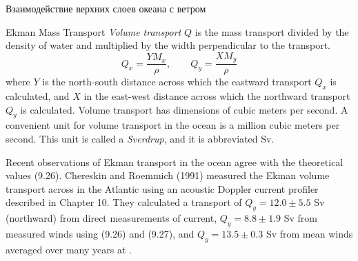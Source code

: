 \begin{chapter}{Взаимодействие верхних слоев океана с ветром}
\begin{section}{Ekman Mass Transport}
\textit{Volume transport} $Q$ is the mass
transport divided by the density of water and multiplied by the width
perpendicular to the transport.
\begin{equation}
 Q_x=\frac{Y M_x}{\rho}, \qquad Q_y=\frac{X M_y}{\rho}
\end{equation}
where $Y$ is the north-south distance across which the eastward
transport $Q_x$ is calculated, and $X$ in
the east-west distance across which the northward transport $Q_y$ is
calculated. Volume transport has dimensions of cubic meters per
second. A convenient unit for volume transport in the ocean is a
million cubic meters per second. This unit is called a
\textit{Sverdrup}, and it is abbreviated Sv.
%

Recent observations of Ekman transport in the ocean agree with the theoretical values
(9.26). Chereskin and Roemmich (1991) measured the Ekman volume
transport across  in the Atlantic using an acoustic
Doppler current profiler described in Chapter 10. They calculated a
transport of $Q_y = 12.0 \pm 5.5$ Sv (northward) from direct
measurements of current, $Q_y = 8.8 \pm 1.9$ Sv from measured winds
using (9.26) and (9.27), and $Q_y = 13.5 \pm 0.3$ Sv from mean winds
averaged over many years at  .
%


\end{section}
\end{chapter}
